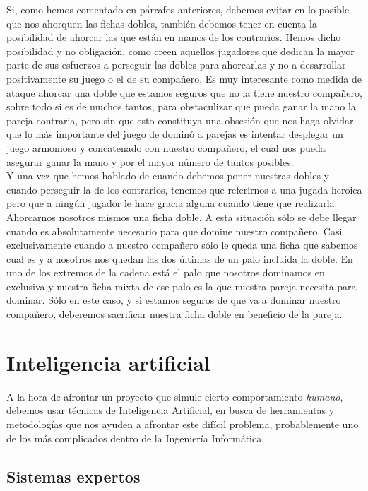 Si, como hemos comentado en párrafos anteriores, debemos evitar en lo posible que nos ahorquen las fichas dobles,
también debemos tener en cuenta la posibilidad de ahorcar las que están en manos de los contrarios. Hemos dicho
posibilidad y no obligación, como creen aquellos jugadores que dedican la mayor parte de sus esfuerzos a perseguir
las dobles para ahorcarlas y no a desarrollar positivamente su juego o el de su compañero. Es muy interesante como
medida de ataque ahorcar una doble que estamos seguros que no la tiene nuestro compañero, sobre todo si es
de muchos tantos, para obstaculizar que pueda ganar la mano la pareja contraria, pero sin que esto constituya una
obsesión que nos haga olvidar que lo más importante del juego de dominó a parejas es intentar desplegar un juego
armonioso y concatenado con nuestro compañero, el cual nos pueda asegurar ganar la mano y por el mayor número de tantos
posibles. \\

Y una vez que hemos hablado de cuando debemos poner nuestras dobles y cuando perseguir la de los contrarios, tenemos que
referirnos a una jugada heroica pero que a ningún jugador le hace gracia alguna cuando tiene que realizarla: Ahorcarnos
nosotros mismos una ficha doble. A esta situación sólo se debe llegar cuando es absolutamente necesario para que domine
nuestro compañero. Casi exclusivamente cuando a nuestro compañero sólo le queda una ficha que sabemos cual es y a nosotros
nos quedan las dos últimas de un palo incluida la doble. En uno de los extremos de la cadena está el palo que nosotros
dominamos en exclusiva y nuestra ficha mixta de ese palo es la que nuestra pareja necesita para dominar. Sólo en este
caso, y si estamos seguros de que va a dominar nuestro compañero, deberemos sacrificar nuestra ficha doble en
beneficio de la pareja.


\section{Inteligencia artificial}

A la hora de afrontar un proyecto que simule cierto comportamiento \emph{humano}, debemos usar técnicas de Inteligencia Artificial, en busca de herramientas y metodologías que nos ayuden a afrontar este difícil problema, probablemente uno de los más complicados dentro de la Ingeniería Informática. 

\subsection{Sistemas expertos}

